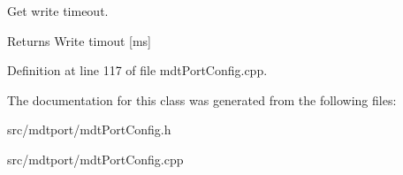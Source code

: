 Get write timeout. 

\begin{DoxyReturn}{Returns}
Write timout \mbox{[}ms\mbox{]} 
\end{DoxyReturn}


Definition at line 117 of file mdtPortConfig.cpp.



The documentation for this class was generated from the following files:\begin{DoxyCompactItemize}
\item 
src/mdtport/mdtPortConfig.h\item 
src/mdtport/mdtPortConfig.cpp\end{DoxyCompactItemize}
